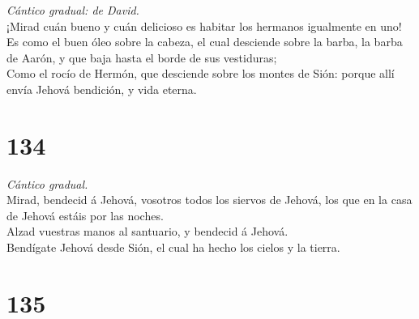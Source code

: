  \emph{Cántico gradual: de David.}\\
¡Mirad cuán bueno y cuán delicioso es habitar los hermanos igualmente en
uno!\\
 Es como el buen óleo sobre la cabeza, el cual desciende
sobre la barba, la barba de Aarón, y que baja hasta el borde de sus
vestiduras;\\
 Como el rocío de Hermón, que desciende sobre los montes de
Sión: porque allí envía Jehová bendición, y vida eterna.

\hypertarget{section-133}{%
\section{134}\label{section-133}}

 \emph{Cántico gradual.}\\
Mirad, bendecid á Jehová, vosotros todos los siervos de Jehová, los que
en la casa de Jehová estáis por las noches.\\
 Alzad vuestras manos al santuario, y bendecid á Jehová.\\
 Bendígate Jehová desde Sión, el cual ha hecho los cielos y
la tierra.

\hypertarget{section-134}{%
\section{135}\label{section-134}}

